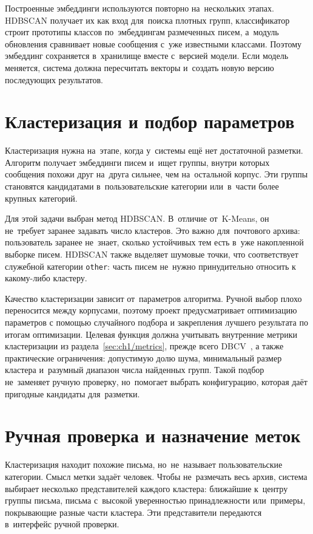 Построенные эмбеддинги используются повторно на~нескольких этапах. HDBSCAN
получает их как вход для~поиска плотных групп, классификатор строит прототипы
классов по~эмбеддингам размеченных писем, а~модуль обновления сравнивает новые
сообщения с~уже известными классами. Поэтому эмбеддинг сохраняется в~хранилище
вместе с~версией модели. Если модель меняется, система должна пересчитать
векторы и~создать новую версию последующих результатов.

\section{Кластеризация и подбор параметров}\label{sec:ch2/clustering}

Кластеризация нужна на~этапе, когда у~системы ещё нет достаточной разметки.
Алгоритм получает эмбеддинги писем и~ищет группы, внутри которых сообщения
похожи друг на~друга сильнее, чем на~остальной корпус. Эти группы становятся
кандидатами в~пользовательские категории или~в~части более крупных категорий.

Для этой задачи выбран метод HDBSCAN. В~отличие от~K-Means,
он не~требует заранее задавать число кластеров. Это важно для~почтового архива:
пользователь заранее не~знает, сколько устойчивых тем есть в~уже накопленной
выборке писем. HDBSCAN также выделяет шумовые точки, что соответствует служебной
категории \texttt{other}: часть писем не~нужно принудительно относить к
какому-либо кластеру.

Качество кластеризации зависит от~параметров алгоритма. Ручной выбор плохо
переносится между корпусами, поэтому проект предусматривает оптимизацию параметров
с помощью случайного подбора и закрепления лучшего результата по итогам оптимизации.
Целевая функция должна учитывать внутренние метрики кластеризации из
раздела~\ref{sec:ch1/metrics}, прежде всего DBCV~\autocite{Moulavi2014DBCV}, а
также практические ограничения: допустимую долю шума, минимальный размер
кластера и~разумный диапазон числа найденных групп. Такой подбор не~заменяет
ручную проверку, но~помогает выбрать конфигурацию, которая даёт пригодные
кандидаты для~разметки.

\section{Ручная проверка и назначение меток}\label{sec:ch2/annotation}

Кластеризация находит похожие письма, но~не~называет пользовательские категории.
Смысл метки задаёт человек. Чтобы не~размечать весь архив, система выбирает
несколько представителей каждого кластера: ближайшие к~центру группы письма,
письма с~высокой уверенностью принадлежности или~примеры, покрывающие разные
части кластера. Эти представители передаются в~интерфейс ручной проверки.

